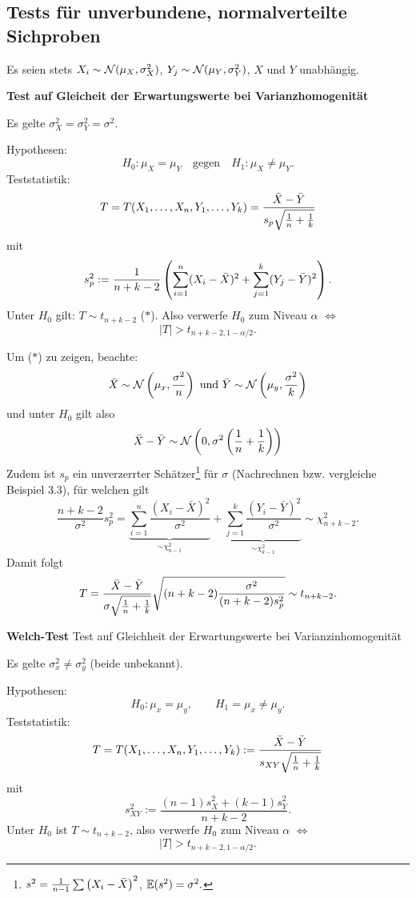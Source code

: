 \subsection{Tests für unverbundene, normalverteilte Sichproben}
Es seien stets $X_i \sim \mathcal{N}(\mu_X, \sigma_X^2)$, $Y_j \sim \mathcal{N}(\mu_Y,
\sigma_Y^2)$, $X$ und $Y$ unabhängig.

\begin{mdframed}
  \textbf{Test auf Gleicheit der Erwartungswerte bei Varianzhomogenität}

  Es gelte $\sigma_X^2 = \sigma_Y^2 = \sigma^2$.

  Hypothesen:
  \[ H_0 : \mu_X = \mu_Y \quad \text{gegen} \quad
    H_1 : \mu_X \ne \mu_Y. \]
  Teststatistik:
  \[ T = T(X_1, \ldots, X_n, Y_1, \ldots, Y_k) =
    \frac{\bar{X}-\bar{Y}}{s_p \sqrt{\frac{1}{n}+\frac{1}{k}}} \]
  mit
  \[ s_p^2 := \frac{1}{n+k-2} \left(
      \sum_{i=1}^n (X_i - \bar{X})^2
      + \sum_{j=1}^k (Y_j - \bar{Y})^2
    \right). \]
  Unter $H_0$ gilt: $T \sim t_{n+k-2}$ ($\ast$). Also verwerfe $H_0$ zum Niveau
  $\alpha$ $\Leftrightarrow$
  \[ |T| > t_{n+k-2, 1 - \alpha / 2}. \]
\end{mdframed}

Um ($\ast$) zu zeigen, beachte:
\[ \bar{X} \sim \mathcal{N} \left( \mu_x, \frac{\sigma^2}{n} \right)
  \text{ und }
  \bar{Y} \sim \mathcal{N} \left( \mu_y, \frac{\sigma^2}{k} \right)
\]
und unter $H_0$ gilt also
\[ \bar{X} - \bar{Y} \sim \mathcal{N} 
  \left(
    0, \sigma^2 \left( \frac{1}{n} + \frac{1}{k} \right)
  \right) \]
Zudem ist $s_p$ ein unverzerrter Schätzer\footnote{%
  $s^2 = \frac{1}{n-1} \sum \left( X_i - \bar{X} \right)^2$, 
  $\mathbb{E}(s^2) = \sigma^2.$
} für $\sigma$ (Nachrechnen bzw.
vergleiche Beispiel 3.3), für welchen gilt
\[ \frac{n+k-2}{\sigma^2} s_p^2
  = \underbrace{\sum_{i=1}^n \frac{(X_i - \bar{X})^2}{\sigma^2}}_{\sim
    \chi^2_{n-1}}
  + \underbrace{\sum_{j=1}^k \frac{(Y_i - \bar{Y})^2}{\sigma^2}}_{\sim
    \chi^2_{k-1}}
  \sim \chi^2_{n+k-2}.
\]
Damit folgt
\[ T = \frac{\bar{X}-\bar{Y}}{\sigma \sqrt{\frac{1}{n}+\frac{1}{k}}}
  \sqrt{(n+k-2) \frac{\sigma^2}{(n+k-2)s_p^2}}
  \sim t_{n+k-2}. \]

\begin{mdframed}
  \textbf{Welch-Test} Test auf Gleichheit der Erwartungswerte bei
  Varianzinhomogenität

  Es gelte $\sigma_x^2 \ne \sigma_y^2$ (beide unbekannt).

  Hypothesen:
  \[ H_0 : \mu_x = \mu_y, \qquad H_1 = \mu_x \ne \mu_y. \]
  Teststatistik:
  \[ T = T(X_1, \ldots, X_n, Y_1, \ldots, Y_k)
    := \frac{\bar{X}-\bar{Y}}{s_{XY} \sqrt{\frac{1}{n}+\frac{1}{k}}} \]
  mit
  \[ s_{XY}^2 := \frac{(n-1) s_X^2 + (k-1) s_Y^2}{n+k-2}. \]
  Unter $H_0$ ist $T \sim t_{n+k-2}$, also verwerfe $H_0$ zum Niveau $\alpha$
  $\Leftrightarrow$
  \[ |T| > t_{n+k-2,1 - \alpha/2}. \]
\end{mdframed}

